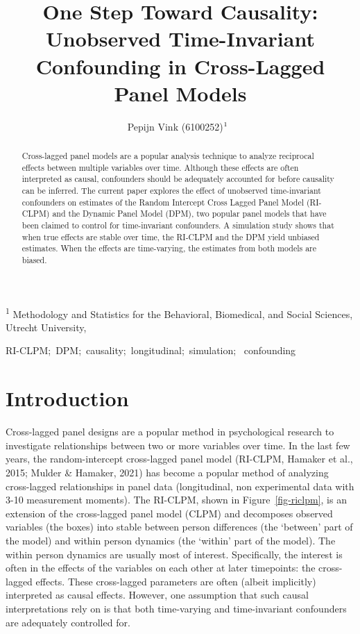 \documentclass[
]{interact}
\title{One Step Toward Causality: Unobserved Time-Invariant Confounding
in Cross-Lagged Panel Models}
\author{Pepijn Vink
(6100252)$\textsuperscript{1}$~\orcidlink{0000-0001-6960-9904}}
\begin{document}
\captionsetup{labelsep=space}
\maketitle
\textsuperscript{1} Methodology and Statistics for the Behavioral,
Biomedical, and Social Sciences, Utrecht University,  
\begin{abstract}
Cross-lagged panel models are a popular analysis technique to analyze
reciprocal effects between multiple variables over time. Although these
effects are often interpreted as causal, confounders should be
adequately accounted for before causality can be inferred. The current
paper explores the effect of unobserved time-invariant confounders on
estimates of the Random Intercept Cross Lagged Panel Model (RI-CLPM) and
the Dynamic Panel Model (DPM), two popular panel models that have been
claimed to control for time-invariant confounders. A simulation study
shows that when true effects are stable over time, the RI-CLPM and the
DPM yield unbiased estimates. When the effects are time-varying, the
estimates from both models are biased.
\end{abstract}
\begin{keywords}
\def\sep{;\ }
RI-CLPM\sep DPM\sep causality\sep longitudinal\sep simulation\sep 
confounding
\end{keywords}
\ifdefined\Shaded\renewenvironment{Shaded}{\begin{tcolorbox}[boxrule=0pt, enhanced, frame hidden, sharp corners, interior hidden, breakable, borderline west={3pt}{0pt}{shadecolor}]}{\end{tcolorbox}}\fi

\newcommand{\indep}{\perp \!\!\! \perp}

\hypertarget{introduction}{%
\section{Introduction}\label{introduction}}

Cross-lagged panel designs are a popular method in psychological
research to investigate relationships between two or more variables over
time. In the last few years, the random-intercept cross-lagged panel
model (RI-CLPM, Hamaker et al., 2015; Mulder \& Hamaker, 2021) has
become a popular method of analyzing cross-lagged relationships in panel
data (longitudinal, non experimental data with 3-10 measurement
moments). The RI-CLPM, shown in Figure~\ref{fig-riclpm}, is an extension
of the cross-lagged panel model (CLPM) and decomposes observed variables
(the boxes) into stable between person differences (the `between' part
of the model) and within person dynamics (the `within' part of the
model). The within person dynamics are usually most of interest.
Specifically, the interest is often in the effects of the variables on
each other at later timepoints: the cross-lagged effects. These
cross-lagged parameters are often (albeit implicitly) interpreted as
causal effects. However, one assumption that such causal interpretations
rely on is that both time-varying and time-invariant confounders are
adequately controlled for.
\end{document}
